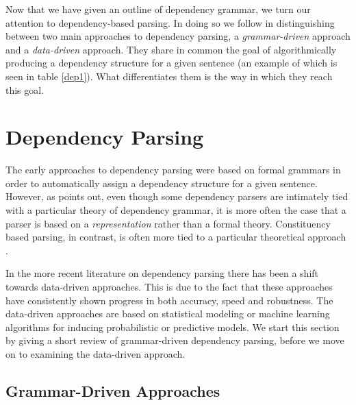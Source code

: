 Now that we have given an outline of dependency grammar, we turn our attention to dependency-based parsing. In doing so we follow  in distinguishing between two main approaches to dependency parsing, a \textit{grammar-driven} approach and a \textit{data-driven} approach. They share in common the goal of algorithmically producing a dependency structure for a given sentence (an example of which is seen in table \ref{dep1}). What differentiates them is the way in which they reach this goal.

\section{Dependency Parsing}
\label{parsing}

The early approaches to dependency parsing were based on formal grammars in order to automatically assign a dependency structure for a given sentence. However, as \citeauthor{Niv:05} points out, even though some dependency parsers are intimately tied with a particular theory of dependency grammar, it is more often the case that a parser is based on a \textit{representation} rather than a formal theory. Constituency based parsing, in contrast, is often more tied to a particular theoretical approach \cite{Niv:05}.


In the more recent literature on dependency parsing there has been a shift towards data-driven approaches. This is due to the fact that these approaches have consistently shown progress in both accuracy, speed and robustness. The data-driven approaches are based on statistical modeling or machine learning algorithms for inducing probabilistic or predictive models. We start this section by giving a short review of grammar-driven dependency parsing, before we move on to examining the data-driven approach.

\subsection{Grammar-Driven Approaches}
\label{grammar-driven}

